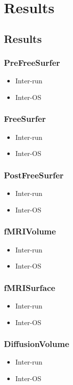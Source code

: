 \chapter{Results}

\section{Results}

\subsection{PreFreeSurfer}
  \begin{itemize}
    \item Inter-run
    \item Inter-OS
  \end{itemize}
  
\subsection{FreeSurfer}
\begin{itemize}
    \item Inter-run
    \item Inter-OS
  \end{itemize}
  
\subsection{PostFreeSurfer}
\begin{itemize}
    \item Inter-run
    \item Inter-OS
  \end{itemize}
  
\subsection{fMRIVolume}
\begin{itemize}
    \item Inter-run
    \item Inter-OS
  \end{itemize}
  
\subsection{fMRISurface}
\begin{itemize}
    \item Inter-run
    \item Inter-OS
  \end{itemize}
  
\subsection{DiffusionVolume}
\begin{itemize}
    \item Inter-run
    \item Inter-OS
  \end{itemize}

